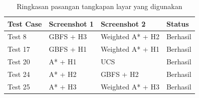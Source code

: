 \begin{table}[H]
	\centering
	\caption{Ringkasan pasangan tangkapan layar yang digunakan}
	\begin{tabular}{|p{2.2cm}|p{4.3cm}|p{4.3cm}|p{3cm}|}
		\hline
		\rowcolor{blue!15}
		\textbf{Test Case} & \textbf{Screenshot 1} & \textbf{Screenshot 2} & \textbf{Status} \\
		\hline
		Test 8 & GBFS + H3 & Weighted A* + H2 & Berhasil \\
		\hline
		Test 17 & GBFS + H1 & Weighted A* + H1 & Berhasil \\
		\hline
		Test 20 & A* + H1 & UCS & Berhasil \\
		\hline
		Test 24 & A* + H2 & GBFS + H2 & Berhasil \\
		\hline
		Test 25 & A* + H3 & Weighted A* + H3 & Berhasil \\
		\hline
	\end{tabular}
\end{table}
